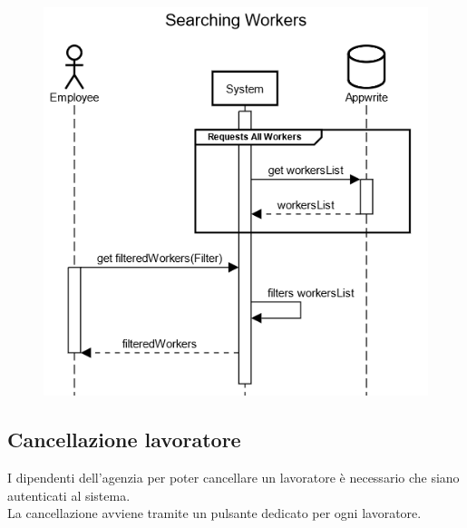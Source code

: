\documentclass[a4paper, oneside, 12pt]{article}
\begin{document}

\begin{figure}[h!]
	\centering
	\includegraphics[width = 8 cm]{images/ricerca}
	\label{fig:Ricerca lavoratore}
\end{figure}

\newpage
\subsection{Cancellazione lavoratore}
I dipendenti dell'agenzia per poter cancellare un lavoratore è necessario che siano autenticati al sistema. \\
La cancellazione avviene tramite un pulsante dedicato per ogni lavoratore. \\
\end{document}

